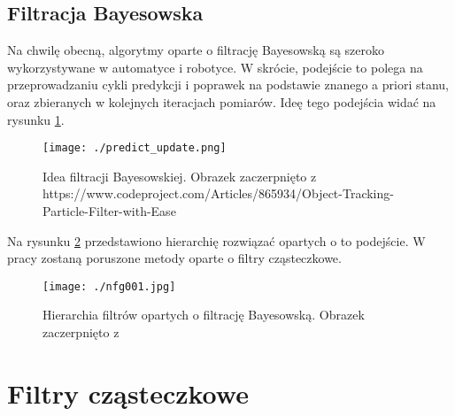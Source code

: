 \documentclass[10pt,a4paper]{article}
\begin{document}
\subsection{Filtracja Bayesowska}
Na chwilę obecną, algorytmy oparte o filtrację Bayesowską są szeroko wykorzystywane w automatyce i robotyce. W skrócie, podejście to polega na przeprowadzaniu cykli predykcji i poprawek na podstawie znanego a priori stanu, oraz zbieranych w kolejnych iteracjach pomiarów. Ideę tego podejścia widać na rysunku \ref{bayes_fil_idea}. 
\begin{figure}[H]
	\begin{center}
		\texttt{[image: ./predict\_update.png]}
		\caption{Idea filtracji Bayesowskiej. Obrazek zaczerpnięto z https://www.codeproject.com/Articles/865934/Object-Tracking-Particle-Filter-with-Ease}
		\label{bayes_fil_idea}
	\end{center}
\end{figure}
Na rysunku \ref{filtr_hier} przedstawiono hierarchię rozwiązać opartych o to podejście. W pracy zostaną poruszone metody oparte o filtry cząsteczkowe.
\begin{figure}
	\begin{center}
		\texttt{[image: ./nfg001.jpg]}
		\caption{Hierarchia filtrów opartych o filtrację Bayesowską. Obrazek zaczerpnięto z \cite{prac_gui}}
		\label{filtr_hier}
	\end{center}
\end{figure}
\section{Filtry cząsteczkowe}
\end{document}
